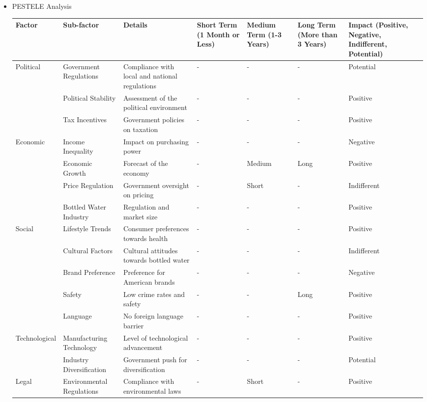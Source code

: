 \documentclass{article}
\begin{document}
\begin{itemize}
\item PESTELE Analysis
\begin{table}[H]
\centering
\begin{tabular}{|m{2cm}|m{2cm}|m{3cm}|m{1.5cm}|m{1.5cm}|m{1.5cm}|m{2cm}|}
\hline 
\textbf{Factor} & \textbf{Sub-factor} & \textbf{Details} & 
\textbf{Short Term (1 Month or Less)} & \textbf{Medium Term (1-3 Years)} & 
\textbf{Long Term (More than 3 Years)} & \textbf{Impact (Positive, Negative, Indifferent, Potential)} \\
\hline 
\multirow{3}{=}{Political} & Government Regulations & Compliance with local and national regulations & - & - & - & Potential \\
\cline{2-7} 
& Political Stability & Assessment of the political environment & - & - & - & Positive \\
\cline{2-7} 
& Tax Incentives & Government policies on taxation & - & - & - & Positive \\
\hline 
\multirow{4}{=}{Economic} & Income Inequality & Impact on purchasing power & - & - & - & Negative \\
\cline{2-7} 
& Economic Growth & Forecast of the economy & - & Medium & Long & Positive \\
\cline{2-7} 
& Price Regulation & Government oversight on pricing & - & Short & - & Indifferent \\
\cline{2-7} 
& Bottled Water Industry & Regulation and market size & - & - & - & Positive \\
\hline 
\multirow{5}{=}{Social} & Lifestyle Trends & Consumer preferences towards health & - & - & - & Positive \\
\cline{2-7} 
& Cultural Factors & Cultural attitudes towards bottled water & - & - & - & Indifferent \\
\cline{2-7} 
& Brand Preference & Preference for American brands & - & - & - & Negative \\
\cline{2-7} 
& Safety & Low crime rates and safety & - & - & Long & Positive \\
\cline{2-7} 
& Language & No foreign language barrier & - & - & - & Positive \\
\hline 
\multirow{2}{=}{Technological} & Manufacturing Technology & Level of technological advancement & - & - & - & Positive \\
\cline{2-7} 
& Industry Diversification & Government push for diversification & - & - & - & Potential \\
\hline 
\multirow{2}{=}{Legal} & Environmental Regulations & Compliance with environmental laws & - & Short & - & Positive \\

\end{tabular}
\end{table}
\end{itemize}
\end{document}
